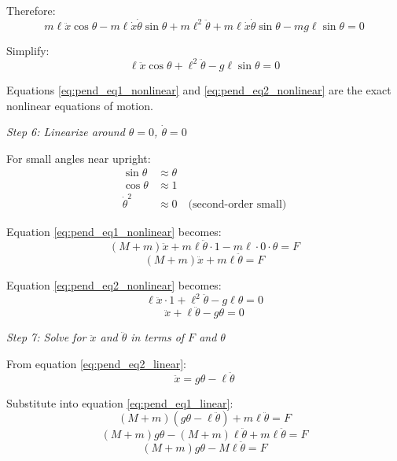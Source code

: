 \begin{example}
Therefore:
\begin{equation}
m\ell\ddot{x}\cos\theta - m\ell\dot{x}\dot{\theta}\sin\theta + m\ell^2\ddot{\theta} + m\ell\dot{x}\dot{\theta}\sin\theta - mg\ell\sin\theta = 0
\end{equation}

Simplify:
\begin{equation}
\ell\ddot{x}\cos\theta + \ell^2\ddot{\theta} - g\ell\sin\theta = 0
\label{eq:pend_eq2_nonlinear}
\end{equation}

Equations \eqref{eq:pend_eq1_nonlinear} and \eqref{eq:pend_eq2_nonlinear} are the exact nonlinear equations of motion.

\textit{Step 6: Linearize around $\theta = 0$, $\dot{\theta} = 0$}

For small angles near upright:
\begin{align}
\sin\theta &\approx \theta \\
\cos\theta &\approx 1 \\
\dot{\theta}^2 &\approx 0 \quad \text{(second-order small)}
\end{align}

Equation \eqref{eq:pend_eq1_nonlinear} becomes:
\begin{equation}
(M+m)\ddot{x} + m\ell\ddot{\theta} \cdot 1 - m\ell \cdot 0 \cdot \theta = F
\end{equation}
\begin{equation}
(M+m)\ddot{x} + m\ell\ddot{\theta} = F
\label{eq:pend_eq1_linear}
\end{equation}

Equation \eqref{eq:pend_eq2_nonlinear} becomes:
\begin{equation}
\ell\ddot{x} \cdot 1 + \ell^2\ddot{\theta} - g\ell \theta = 0
\end{equation}
\begin{equation}
\ddot{x} + \ell\ddot{\theta} - g\theta = 0
\label{eq:pend_eq2_linear}
\end{equation}

\textit{Step 7: Solve for $\ddot{x}$ and $\ddot{\theta}$ in terms of $F$ and $\theta$}

From equation \eqref{eq:pend_eq2_linear}:
\begin{equation}
\ddot{x} = g\theta - \ell\ddot{\theta}
\end{equation}

Substitute into equation \eqref{eq:pend_eq1_linear}:
\begin{equation}
(M+m)(g\theta - \ell\ddot{\theta}) + m\ell\ddot{\theta} = F
\end{equation}
\begin{equation}
(M+m)g\theta - (M+m)\ell\ddot{\theta} + m\ell\ddot{\theta} = F
\end{equation}
\begin{equation}
(M+m)g\theta - M\ell\ddot{\theta} = F
\end{equation}


\end{example}
